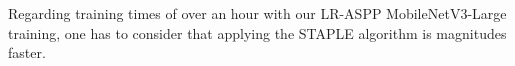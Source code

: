     Regarding training times of over an hour with our LR-ASPP MobileNetV3-Large training, one has to consider that applying the STAPLE algorithm is magnitudes faster.

